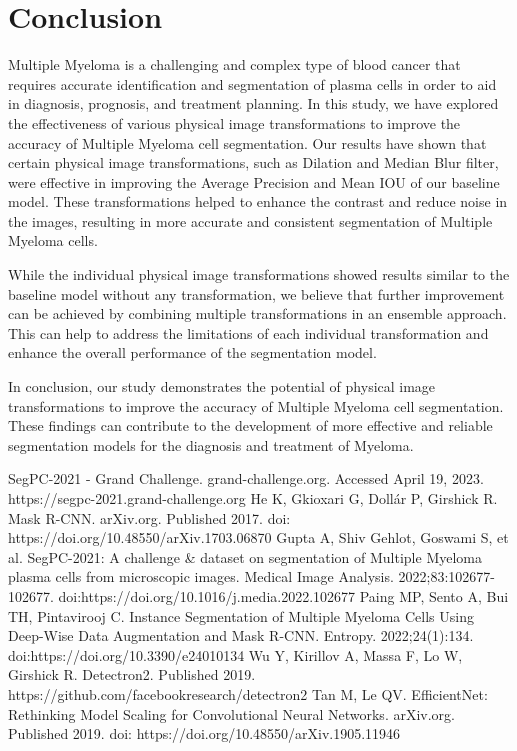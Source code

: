 \documentclass{article}
\begin{document}
\section{Conclusion}

Multiple Myeloma is a challenging and complex type of blood cancer that requires accurate identification and segmentation of plasma cells in order to aid in diagnosis, prognosis, and treatment planning. In this study, we have explored the effectiveness of various physical image transformations to improve the accuracy of Multiple Myeloma cell segmentation. Our results have shown that certain physical image transformations, such as Dilation and Median Blur filter, were effective in improving the Average Precision and Mean IOU of our baseline model. These transformations helped to enhance the contrast and reduce noise in the images, resulting in more accurate and consistent segmentation of Multiple Myeloma cells.

While the individual physical image transformations showed results similar to the baseline model without any transformation, we believe that further improvement can be achieved by combining multiple transformations in an ensemble approach. This can help to address the limitations of each individual transformation and enhance the overall performance of the segmentation model.

In conclusion, our study demonstrates the potential of physical image transformations to improve the accuracy of Multiple Myeloma cell segmentation. These findings can contribute to the development of more effective and reliable segmentation models for the diagnosis and treatment of Myeloma.

\begin{thebibliography}{99}

  \bibitem{} SegPC-2021 - Grand Challenge. grand-challenge.org. Accessed April 19, 2023. https://segpc-2021.grand-challenge.org
  \bibitem{} He K, Gkioxari G, Dollár P, Girshick R. Mask R-CNN. arXiv.org. Published 2017. doi: https://doi.org/10.48550/arXiv.1703.06870
  \bibitem{} Gupta A, Shiv Gehlot, Goswami S, et al. SegPC-2021: A challenge \& dataset on segmentation of Multiple Myeloma plasma cells from microscopic images. Medical Image Analysis. 2022;83:102677-102677. doi:https://doi.org/10.1016/j.media.2022.102677
  \bibitem{} Paing MP, Sento A, Bui TH, Pintavirooj C. Instance Segmentation of Multiple Myeloma Cells Using Deep-Wise Data Augmentation and Mask R-CNN. Entropy. 2022;24(1):134. doi:https://doi.org/10.3390/e24010134
  \bibitem{} Wu Y, Kirillov A, Massa F, Lo W, Girshick R. Detectron2. Published 2019. https://github.com/facebookresearch/detectron2
  \bibitem{} Tan M, Le QV. EfficientNet: Rethinking Model Scaling for Convolutional Neural Networks. arXiv.org. Published 2019. doi: https://doi.org/10.48550/arXiv.1905.11946
  
\end{thebibliography}
\end{document}

